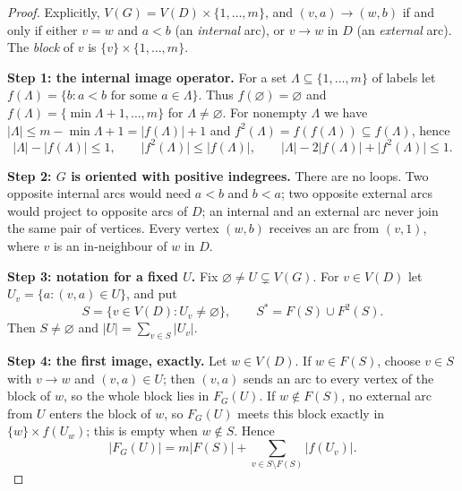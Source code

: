 \documentclass[11pt]{article}
\theoremstyle{remark}
\newcommand{\abs}[1]{\lvert #1\rvert}
\newcommand{\Step}[1]{\par\medskip\noindent\textbf{#1}\enspace}
\begin{document}
\begin{proof}
Explicitly, $V(G)=V(D)\times\{1,\dots,m\}$, and $(v,a)\to(w,b)$ if and only
if either $v=w$ and $a<b$ (an \emph{internal} arc), or $v\to w$ in $D$ (an
\emph{external} arc). The \emph{block} of $v$ is $\{v\}\times\{1,\dots,m\}$.

\Step{Step 1: the internal image operator.}
For a set $\Lambda\subseteq\{1,\dots,m\}$ of labels let
$f(\Lambda)=\{b:a<b\text{ for some }a\in\Lambda\}$. Thus
$f(\varnothing)=\varnothing$ and
$f(\Lambda)=\{\min\Lambda+1,\dots,m\}$ for $\Lambda\ne\varnothing$. For
nonempty $\Lambda$ we have $\abs\Lambda\le m-\min\Lambda+1=\abs{f(\Lambda)}+1$
and $f^2(\Lambda)=f(f(\Lambda))\subseteq f(\Lambda)$, hence
\begin{equation}
\label{eq:internal-block-bound}
  \abs{\Lambda}-\abs{f(\Lambda)}\le1,\qquad
  \abs{f^2(\Lambda)}\le\abs{f(\Lambda)},\qquad
  \abs{\Lambda}-2\abs{f(\Lambda)}+\abs{f^2(\Lambda)}\le1 .
\end{equation}

\Step{Step 2: $G$ is oriented with positive indegrees.}
There are no loops. Two opposite internal arcs would need $a<b$ and $b<a$;
two opposite external arcs would project to opposite arcs of $D$; an
internal and an external arc never join the same pair of vertices. Every
vertex $(w,b)$ receives an arc from $(v,1)$, where $v$ is an in-neighbour
of $w$ in $D$.

\Step{Step 3: notation for a fixed $U$.}
Fix $\varnothing\ne U\subsetneq V(G)$. For $v\in V(D)$ let
$U_v=\{a:(v,a)\in U\}$, and put
\[
  S=\{v\in V(D):U_v\ne\varnothing\},\qquad
  S^{*}=F(S)\cup F^2(S).
\]
Then $S\ne\varnothing$ and $\abs U=\sum_{v\in S}\abs{U_v}$.

\Step{Step 4: the first image, exactly.}
Let $w\in V(D)$. If $w\in F(S)$, choose $v\in S$ with $v\to w$ and
$(v,a)\in U$; then $(v,a)$ sends an arc to every vertex of the block of
$w$, so the whole block lies in $F_G(U)$. If $w\notin F(S)$, no external
arc from $U$ enters the block of $w$, so $F_G(U)$ meets this block exactly
in $\{w\}\times f(U_w)$; this is empty when $w\notin S$. Hence
\begin{equation}\label{eq:first-image}
  \abs{F_G(U)}=m\abs{F(S)}
     +\sum_{v\in S\setminus F(S)}\abs{f(U_v)}.
\end{equation}


\end{proof}
\end{document}

